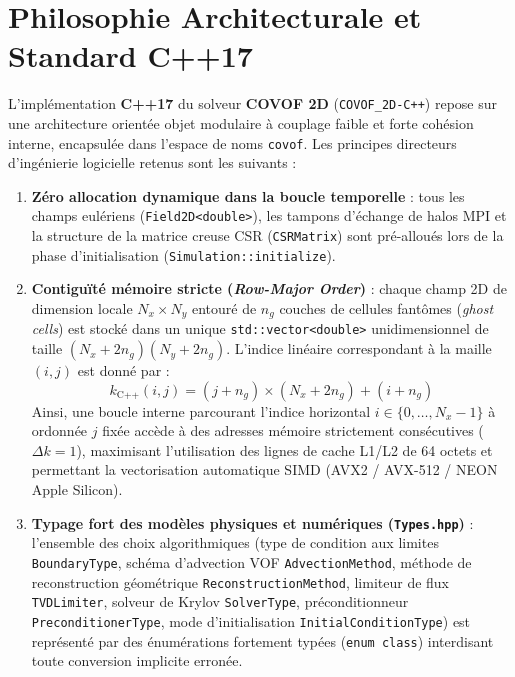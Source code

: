 \documentclass[10pt,a4paper,oneside]{book}
\begin{document}
\section{Philosophie Architecturale et Standard C++17}
L'implémentation \textbf{C++17} du solveur \textbf{COVOF 2D} (\texttt{COVOF\_2D-C++}) repose sur une architecture orientée objet modulaire à couplage faible et forte cohésion interne, encapsulée dans l'espace de noms \texttt{covof}. Les principes directeurs d'ingénierie logicielle retenus sont les suivants :
\begin{enumerate}
  \item \textbf{Zéro allocation dynamique dans la boucle temporelle} : tous les champs eulériens (\texttt{Field2D<double>}), les tampons d'échange de halos MPI et la structure de la matrice creuse CSR (\texttt{CSRMatrix}) sont pré-alloués lors de la phase d'initialisation (\texttt{Simulation::initialize}).
  \item \textbf{Contiguïté mémoire stricte (\emph{Row-Major Order})} : chaque champ 2D de dimension locale $N_x \times N_y$ entouré de $n_g$ couches de cellules fantômes (\emph{ghost cells}) est stocké dans un unique \texttt{std::vector<double>} unidimensionnel de taille $(N_x + 2n_g)(N_y + 2n_g)$. L'indice linéaire correspondant à la maille $(i, j)$ est donné par :
  \begin{equation}
    k_{\text{C++}}(i, j) = (j + n_g) \times (N_x + 2n_g) + (i + n_g)
  \end{equation}
  Ainsi, une boucle interne parcourant l'indice horizontal $i \in \{0, \dots, N_x-1\}$ à ordonnée $j$ fixée accède à des adresses mémoire strictement consécutives ($\Delta k = 1$), maximisant l'utilisation des lignes de cache L1/L2 de 64 octets et permettant la vectorisation automatique SIMD (AVX2 / AVX-512 / NEON Apple Silicon).
  \item \textbf{Typage fort des modèles physiques et numériques (\texttt{Types.hpp})} : l'ensemble des choix algorithmiques (type de condition aux limites \texttt{BoundaryType}, schéma d'advection VOF \texttt{AdvectionMethod}, méthode de reconstruction géométrique \texttt{ReconstructionMethod}, limiteur de flux \texttt{TVDLimiter}, solveur de Krylov \texttt{SolverType}, préconditionneur \texttt{PreconditionerType}, mode d'initialisation \texttt{InitialConditionType}) est représenté par des énumérations fortement typées (\texttt{enum class}) interdisant toute conversion implicite erronée.
\end{enumerate}
\end{document}
